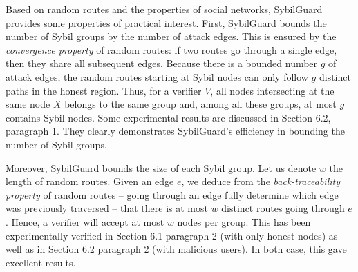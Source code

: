 \documentclass[a4paper,11pt]{article}
\begin{document}




Based on random routes and the properties of social networks,
SybilGuard provides some properties of practical interest. First,
SybilGuard bounds the number of Sybil groups by the number of attack
edges.  This is ensured by the \emph{convergence property} of random
routes: if two routes go through a single edge, then they share all
subsequent edges.  Because there is a bounded number $g$ of attack
edges, the random routes starting at Sybil nodes can only follow $g$
distinct paths in the honest region.  Thus, for a verifier $V$, all
nodes intersecting at the same node $X$ belongs to the same group and,
among all these groups, at most $g$ contains Sybil nodes. Some
experimental results are discussed in Section 6.2, paragraph 1. They
clearly demonstrates SybilGuard's efficiency in bounding the number of
Sybil groups.

Moreover, SybilGuard bounds the size of each Sybil group. Let us
denote $w$ the length of random routes.  Given an edge $e$, we deduce
from the \emph{back-traceability property} of random routes -- going
through an edge fully determine which edge was previously traversed --
that there is at most $w$ distinct routes going through $e$.  Hence, a
verifier will accept at most $w$ nodes per group. This has been
experimentally verified in Section 6.1 paragraph 2 (with only honest
nodes) as well as in Section 6.2 paragraph 2 (with malicious
users). In both case, this gave excellent results.
\end{document}
